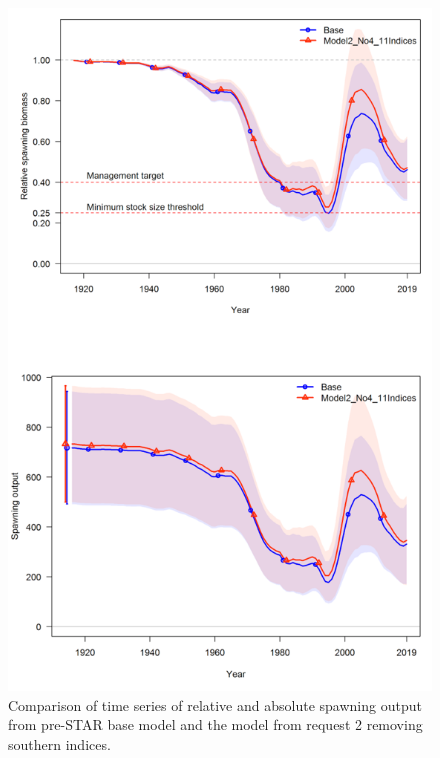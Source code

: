 \documentclass[12pt,]{article}
\begin{document}
\FloatBarrier

\begin{figure}
\centering
\includegraphics{Figures/STAR_request2.png}
\caption{Comparison of time series of relative and absolute spawning
output from pre-STAR base model and the model from request 2 removing
southern indices. \label{fig:STAR_request2}}
\end{figure}
\end{document}
